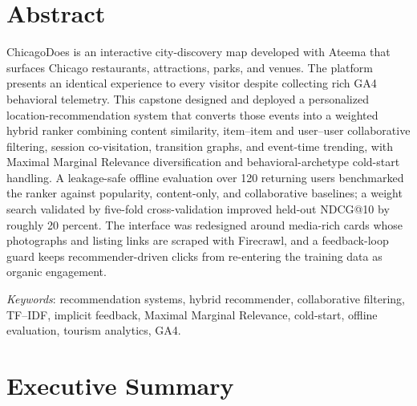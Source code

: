 \documentclass[12pt,letterpaper]{article}
\begin{document}
\section*{Abstract}
\noindent
ChicagoDoes is an interactive city-discovery map developed with Ateema
that surfaces Chicago restaurants, attractions, parks, and venues. The
platform presents an identical experience to every visitor despite
collecting rich GA4 behavioral telemetry. This capstone designed and
deployed a personalized location-recommendation system that converts
those events into a weighted hybrid ranker combining content
similarity, item--item and user--user collaborative filtering, session
co-visitation, transition graphs, and event-time trending, with
Maximal Marginal Relevance diversification and behavioral-archetype
cold-start handling. A leakage-safe offline evaluation over 120
returning users benchmarked the ranker against popularity,
content-only, and collaborative baselines; a weight search validated
by five-fold cross-validation improved held-out NDCG@10 by roughly
20 percent. The interface was redesigned around media-rich cards
whose photographs and listing links are scraped with Firecrawl, and
a feedback-loop guard keeps recommender-driven clicks from
re-entering the training data as organic engagement.

\vspace{1in}
\noindent\textit{Keywords}: recommendation systems, hybrid recommender,
collaborative filtering, TF--IDF, implicit feedback, Maximal Marginal
Relevance, cold-start, offline evaluation, tourism analytics, GA4.

\vfill
\newpage

\section*{Executive Summary}
\end{document}
